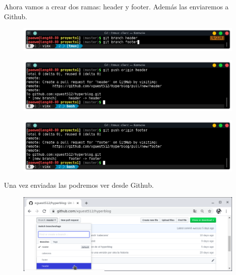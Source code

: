 \documentclass{article}
\begin{document}
\newpage

Ahora vamos a crear dos ramas: header y footer. Además las enviaremos a Github.

\begin{figure}[h!]
  \centering
  \includegraphics[scale=0.75]{./Pictures/252_new_branches.png}
\end{figure}

\begin{figure}[h!]
  \centering
  \includegraphics[scale=0.75]{./Pictures/253_push_header.png}
\end{figure}

\begin{figure}[h!]
  \centering
  \includegraphics[scale=0.75]{./Pictures/254_push_footer.png}
\end{figure}

Una vez enviadas las podremos ver desde Github.

\begin{figure}[h!]
  \centering
  \includegraphics[scale=0.75]{./Pictures/255_branches_github.png}
\end{figure}


\newpage
\end{document}

